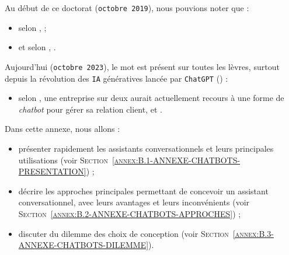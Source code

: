 \DontFrameThisInToc
{}
\label{annex:B-ANNEXE-CHATBOTS}
	
	
	Au début de ce doctorat (\texttt{octobre 2019}), nous pouvions noter que :
	\begin{itemize}
		\item selon \cite{costello-lodolce:2019:gartner-top-technologies},  ;
		\item et selon \cite{goasduff:2019:chatbots-will-appeal}, .
	\end{itemize}
	
	Aujourd'hui (\texttt{octobre 2023}), le mot  est présent sur toutes les lèvres, surtout depuis la révolution des \texttt{IA} génératives lancée par \texttt{ChatGPT} (\cite{openai:2023:chatgpt}) :
	\begin{itemize}
		\item selon \cite{costello-lodolce:2022:gartner-predicts-chatbots}, une entreprise sur deux aurait actuellement recours à une forme de \textit{chatbot} pour gérer sa relation client, et .
	\end{itemize}

	Dans cette annexe, nous allons :
	\begin{itemize}
		\item présenter rapidement les assistants conversationnels et leurs principales utilisations (voir \textsc{Section~\ref{annex:B.1-ANNEXE-CHATBOTS-PRESENTATION}}) ;
		\item décrire les approches principales permettant de concevoir un assistant conversationnel, avec leurs avantages et leurs inconvénients (voir \textsc{Section~\ref{annex:B.2-ANNEXE-CHATBOTS-APPROCHES}}) ;
		\item discuter du dilemme des choix de conception (voir \textsc{Section~\ref{annex:B.3-ANNEXE-CHATBOTS-DILEMME}}).
	\end{itemize}
	
